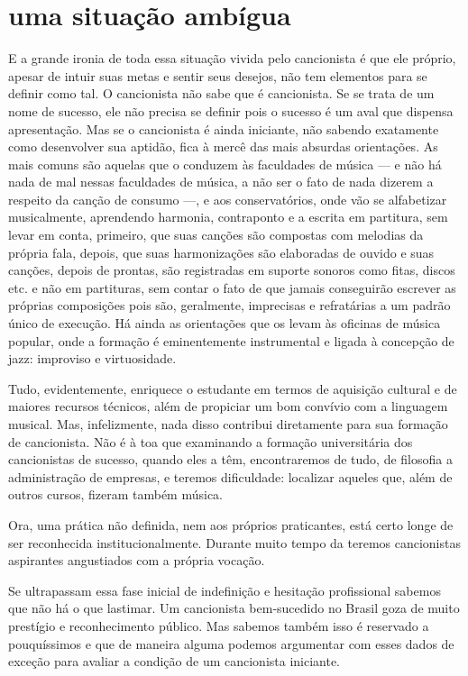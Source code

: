 \section{uma situação ambígua}

E a grande ironia de toda essa situação vivida pelo cancionista é que
ele próprio, apesar de intuir suas metas e sentir seus desejos, não tem
elementos para se definir como tal. O cancionista não sabe que é
cancionista. Se se trata de um nome de sucesso, ele não precisa se
definir pois o sucesso é um aval que dispensa apresentação. Mas se o
cancionista é ainda iniciante, não sabendo exatamente como desenvolver
sua aptidão, fica à mercê das mais absurdas orientações. As mais comuns
são aquelas que o conduzem às faculdades de música --- e não há nada de mal
nessas faculdades de música, a não ser o fato de nada dizerem a respeito
da canção de consumo ---, e aos conservatórios, onde vão se alfabetizar
musicalmente, aprendendo harmonia, contraponto e a escrita em partitura,
sem levar em conta, primeiro, que suas canções são compostas com melodias da
própria fala, depois, que suas harmonizações são elaboradas de ouvido e suas
canções, depois de prontas, são registradas em suporte sonoros como fitas,
discos etc. e não em partituras, sem contar o fato de que jamais
conseguirão escrever as próprias composições pois são, geralmente,
imprecisas e refratárias a um padrão único de execução. Há ainda as orientações que
os levam às
oficinas de música popular, onde a formação é eminentemente
instrumental e ligada à concepção de jazz: improviso e virtuosidade.

Tudo, evidentemente, enriquece o estudante em termos de aquisição
cultural e de maiores recursos técnicos, além de propiciar um bom
convívio com a linguagem musical. Mas, infelizmente, nada disso
contribui diretamente para sua formação de cancionista. Não é à toa que
examinando a formação universitária dos cancionistas de sucesso, quando
eles a têm, encontraremos de tudo, de filosofia a administração de
empresas, e teremos dificuldade: localizar aqueles que, além de outros
cursos, fizeram também música.

Ora, uma prática não definida, nem aos próprios praticantes, está certo
longe de ser reconhecida institucionalmente. Durante muito tempo da
teremos cancionistas aspirantes angustiados com a própria vocação.

Se ultrapassam essa fase inicial de indefinição e hesitação profissional
sabemos que não há o que lastimar. Um cancionista bem-sucedido no Brasil
goza de muito prestígio e reconhecimento público. Mas sabemos também
isso é reservado a pouquíssimos e que de maneira alguma podemos
argumentar com esses dados de exceção para avaliar a condição de um
cancionista iniciante.

